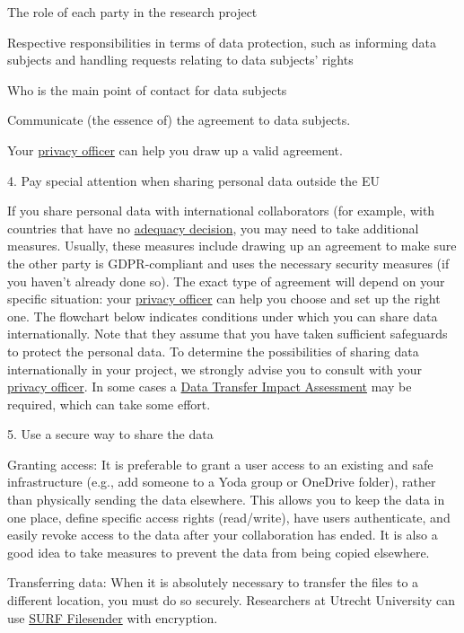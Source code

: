 \documentclass[
]{book}
\begin{document}
The role of each party in the research project

Respective responsibilities in terms of data protection, such as
informing data subjects and handling requests relating to data subjects'
rights

Who is the main point of contact for data subjects

Communicate (the essence of) the agreement to data subjects.

Your \protect\hyperlink{support}{privacy officer} can help you draw up a valid agreement.

4. Pay special attention when sharing personal data outside the EU

If you share personal data with international collaborators (for example,
with countries that have no
\href{https://ec.europa.eu/info/law/law-topic/data-protection/international-dimension-data-protection/adequacy-decisions_en}{adequacy decision},
you may need to take additional measures. Usually, these measures include
drawing up an agreement to make sure the other party is GDPR-compliant and
uses the necessary security measures (if you haven't already done so). The
exact type of agreement will depend on your specific situation: your
\protect\hyperlink{support}{privacy officer} can help you choose and set up the right one.
The flowchart below indicates conditions under which you can share data
internationally. Note that they assume that you have taken sufficient
safeguards to protect the personal data. To determine the possibilities
of sharing data internationally in your project, we strongly advise you
to consult with your \protect\hyperlink{support}{privacy officer}. In some cases a
\protect\hyperlink{dtia}{Data Transfer Impact Assessment} may be required, which can
take some effort.

5. Use a secure way to share the data

Granting access: It is preferable to grant a user access
to an existing and safe infrastructure (e.g., add someone to a Yoda
group or OneDrive folder), rather than physically sending the data
elsewhere. This allows you to keep the data in one place, define
specific access rights (read/write), have users authenticate, and
easily revoke access to the data after your collaboration has ended.
It is also a good idea to take measures to prevent the data from
being copied elsewhere.

Transferring data: When it is absolutely necessary to
transfer the files to a different location, you must do so securely.
Researchers at Utrecht University can use
\href{https://filesender.surf.nl}{SURF Filesender}
with encryption.
\end{document}
